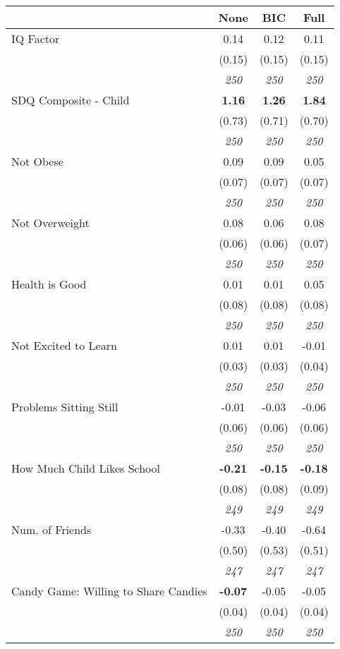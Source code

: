 \begin{tabular}{l c c c}
\toprule
 & None & BIC & Full \\
\midrule
IQ Factor & 0.14 & 0.12 & 0.11 \\
& (0.15) & (0.15) & (0.15) \\
& \textit{ 250 } & \textit{ 250 } & \textit{ 250 } \\
SDQ Composite - Child & \textbf{ 1.16 } & \textbf{ 1.26 } & \textbf{ 1.84 } \\
& (0.73) & (0.71) & (0.70) \\
& \textit{ 250 } & \textit{ 250 } & \textit{ 250 } \\
Not Obese & 0.09 & 0.09 & 0.05 \\
& (0.07) & (0.07) & (0.07) \\
& \textit{ 250 } & \textit{ 250 } & \textit{ 250 } \\
Not Overweight & 0.08 & 0.06 & 0.08 \\
& (0.06) & (0.06) & (0.07) \\
& \textit{ 250 } & \textit{ 250 } & \textit{ 250 } \\
Health is Good & 0.01 & 0.01 & 0.05 \\
& (0.08) & (0.08) & (0.08) \\
& \textit{ 250 } & \textit{ 250 } & \textit{ 250 } \\
Not Excited to Learn & 0.01 & 0.01 & -0.01 \\
& (0.03) & (0.03) & (0.04) \\
& \textit{ 250 } & \textit{ 250 } & \textit{ 250 } \\
Problems Sitting Still & -0.01 & -0.03 & -0.06 \\
& (0.06) & (0.06) & (0.06) \\
& \textit{ 250 } & \textit{ 250 } & \textit{ 250 } \\
How Much Child Likes School & \textbf{ -0.21 } & \textbf{ -0.15 } & \textbf{ -0.18 } \\
& (0.08) & (0.08) & (0.09) \\
& \textit{ 249 } & \textit{ 249 } & \textit{ 249 } \\
Num. of Friends & -0.33 & -0.40 & -0.64 \\
& (0.50) & (0.53) & (0.51) \\
& \textit{ 247 } & \textit{ 247 } & \textit{ 247 } \\
Candy Game: Willing to Share Candies & \textbf{ -0.07 } & -0.05 & -0.05 \\
& (0.04) & (0.04) & (0.04) \\
& \textit{ 250 } & \textit{ 250 } & \textit{ 250 } \\
\bottomrule
\end{tabular}
